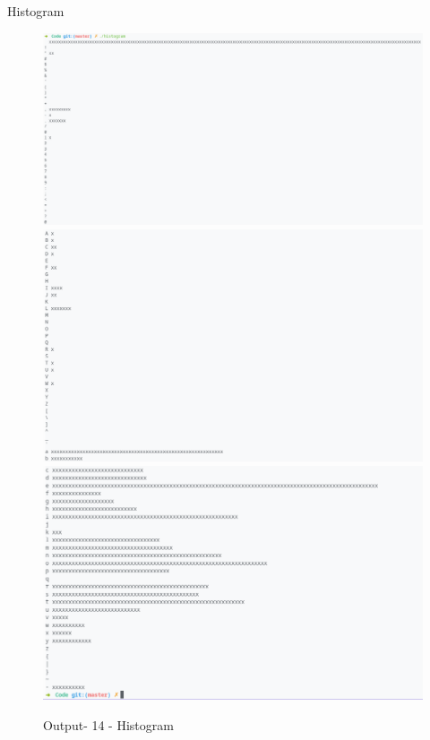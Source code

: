 Histogram
\begin{figure}[!htb]
  \centering
  \includegraphics[width=6in]{Images/histogram1.png}
  \includegraphics[width=6in]{Images/histogram2.png}
  \includegraphics[width=6in]{Images/histogram3.png}
  \label{Output-14-Histogram}
  \caption{Output- 14 - Histogram}
\end{figure}